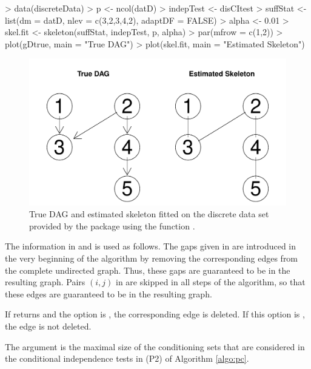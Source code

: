 \documentclass[article]{jss}
\begin{document}
\begin{Schunk}
\begin{Sinput}
> data(discreteData)
> p <- ncol(datD)
> indepTest <- disCItest
> suffStat <- list(dm = datD, nlev = c(3,2,3,4,2), adaptDF = FALSE)
> alpha <- 0.01 
> skel.fit <- skeleton(suffStat, indepTest, p, alpha)
> par(mfrow = c(1,2))
> plot(gDtrue, main = "True DAG")
> plot(skel.fit, main = "Estimated Skeleton")
\end{Sinput}
\end{Schunk}
\begin{figure}
  \begin{center}
\includegraphics{pcalgDoc-skelExp2Plot}
\caption{True DAG and estimated skeleton fitted on the discrete data set provided by the package using the function .}
\label{fig:skel2}
\end{center}
\end{figure}

The information in  and  is used as
follows.  The gaps given in  are introduced in the very
beginning of the algorithm by removing the corresponding edges from the
complete undirected graph. Thus, these gaps are guaranteed to be in the
resulting graph. Pairs $(i,j)$ in  are skipped in
all steps of the algorithm, so that these edges are guaranteed to be in the
resulting graph.

If  returns  and the option  is
, the corresponding edge is deleted. If this option is
, the edge is not deleted.

The argument  is the maximal size of the conditioning sets that
are considered in the conditional independence tests in (P2) of Algorithm \ref{algo:pc}.
          
\end{document}
